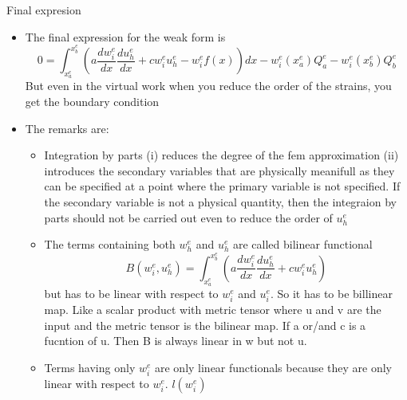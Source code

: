 	\begin{frame}{Final expresion}
		\begin{itemize}
			\item The final expression for the weak form is 
			\begin{equation}
				0 = \int_{x_a^e}^{x_b^e} \left( a \frac{d w_i^e}{dx}\frac{du_h^e}{dx}  + cw^e_iu_h^e -w_i^ef(x) \right)  dx
				- w_i^e(x_a^e)Q_a^e - w_i^e(x_b^e)Q_b^e
			\end{equation}
			But even in the virtual work when you reduce the order of the strains, you get the boundary condition
			\item The remarks are:
			\begin{itemize}
				\item Integration by parts (i) reduces the degree of the fem approximation (ii) introduces the secondary variables that are physically meanifull as they can be specified at a point where the primary variable is not specified. If the secondary variable is not a physical quantity, then the integraion by parts should not be carried out even to reduce the order of $u_h^e$
				\item The terms containing both $w_h^e$ and $u_h^e$ are called bilinear functional 
				\begin{equation}
					B(w_i^e,u_h^e) = \int_{x_a^e}^{x_b^e} \left(a \frac{d w_i^e}{dx}\frac{du_h^e}{dx} + cw^e_iu_h^e \right)
				\end{equation}
				but has to be linear with respect to $w_i^e$ and $u_i^e$. So it has to be billinear map. Like a scalar product with metric tensor where u and v are the input and the metric tensor is the bilinear map. If a or/and c is a fucntion of u. Then B is always linear in w but not u.
				\item Terms having only $w_i^e$ are only linear functionals because they are only linear with respect to $w_i^e$. $l(w_i^e)$
				
			\end{itemize}
		\end{itemize}
	\end{frame}


